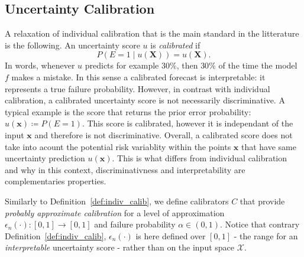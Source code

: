 \documentclass{article}
\theoremstyle{plain}
\theoremstyle{definition}
\theoremstyle{remark}
\begin{document}
\subsection{Uncertainty Calibration}
\label{sec:calibration_intro}

A relaxation of individual calibration that is the main standard in the litterature is the following. An uncertainty score $u$ is \textit{calibrated} if
\begin{equation}
    \label{eq:calibration}
    P(E=1 \mid u(\mathbf{X})) = u(\mathbf{X}).
\end{equation}
In words, whenever $u$ predicts for example $30\%$, then $30\%$ of the time the model $f$ makes a mistake. In this sense a calibrated forecast is interpretable: it represents a true failure probability. However, in contrast with individual calibration, a calibrated uncertainty score is not necessarily discriminative. A typical example is the score that returns the prior error probability: $u(\mathbf{x}) \coloneqq P(E=1)$.  This score is calibrated, however it is independant of the input $\mathbf{x}$ and therefore is not discriminative. Overall, a calibrated score does not take into acount the potential risk variablity within the points $\mathbf{x}$ that have same uncertainty prediction $u(\mathbf{x})$. This is what differs from individual calibration and why in this context, discriminativness and interpretability are complementaries properties. 



Similarly to Definition~\ref{def:indiv_calib}, we define calibrators $C$ that provide \textit{probably approximate calibration} for a level of approximation $\epsilon_n(\cdot): [0,1] \to [0,1]$ and failure probability $\alpha \in (0,1)$. Notice that contrary Definition~\ref{def:indiv_calib}, $\epsilon_n(\cdot)$ is here defined over $[0,1]$ - the range for an \textit{interpretable} uncertainty score - rather than on the input space $\mathcal{X}$.  
\end{document}
